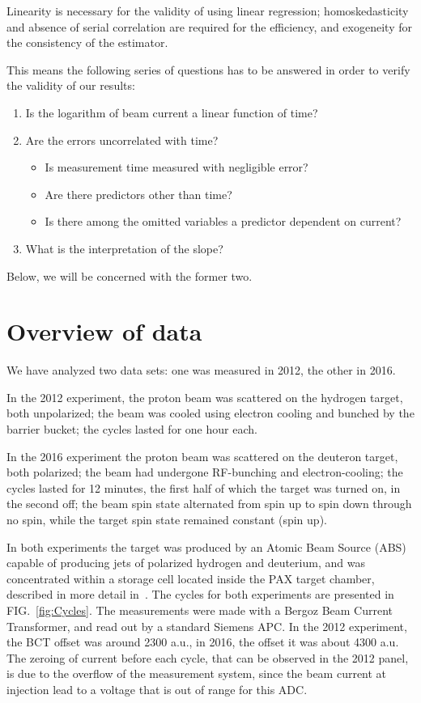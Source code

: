 \documentclass[reprint, superscriptaddress]{revtex4-1}
\begin{document}
Linearity is necessary for the validity of using linear regression; homoskedasticity and absence of serial correlation are required for the efficiency, and exogeneity for the consistency of the estimator.

This means the following series of questions has to be answered in order to verify the validity of our results:
\begin{enumerate}
	\item Is the logarithm of beam current a linear function of time?
	\item Are the errors uncorrelated with time?
		\begin{itemize}
			\item Is measurement time measured with negligible error?
			\item Are there predictors other than time?
			\item Is there among the omitted variables a predictor dependent on current?
		\end{itemize}
	\item What is the interpretation of the slope?
\end{enumerate}

Below, we will be concerned with the former two.

\section{Overview of data}
We have analyzed two data sets: one was measured in 2012, the other in 2016. 

In the 2012 experiment, the proton beam was scattered on the hydrogen target, both unpolarized; the beam was cooled using electron cooling and bunched by the barrier bucket; the cycles lasted for one hour each. 

In the 2016 experiment the proton beam was scattered on the deuteron target, both polarized; the beam had undergone RF-bunching and electron-cooling; the cycles lasted for 12 minutes, the first half of which the target was turned on, in the second off; the beam spin state alternated from spin up to spin down through no spin, while the target spin state remained constant (spin up). 

In both experiments the target was produced by an Atomic Beam Source (ABS) capable of producing jets of polarized hydrogen and deuterium, and was concentrated within a storage cell located inside the PAX target chamber, described in more detail in~\cite{Weidemann}. The cycles for both experiments are presented in FIG.~\ref{fig:Cycles}. The measurements were made with a Bergoz Beam Current Transformer, and read out by a standard Siemens APC. In the 2012 experiment, the BCT offset was around 2300 a.u., in 2016, the offset it was about 4300 a.u. The zeroing of current before each cycle, that can be observed in the 2012 panel, is due to the overflow of the measurement system, since the beam current at injection lead to a voltage that is out of range for this ADC.
\end{document}
